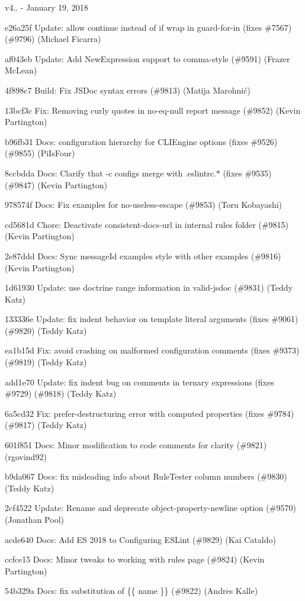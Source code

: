 v4.. -\/ January 19, 2018


\begin{DoxyItemize}
\item e26a25f Update\+: allow continue instead of if wrap in guard-\/for-\/in (fixes \#7567) (\#9796) (Michael Ficarra)
\item af043eb Update\+: Add New\+Expression support to comma-\/style (\#9591) (Frazer Mc\+Lean)
\item 4f898c7 Build\+: Fix JSDoc syntax errors (\#9813) (Matija Marohnić)
\item 13bcf3c Fix\+: Removing curly quotes in no-\/eq-\/null report message (\#9852) (Kevin Partington)
\item b96fb31 Docs\+: configuration hierarchy for CLIEngine options (fixes \#9526) (\#9855) (Pi\+Is\+Four)
\item 8ccbdda Docs\+: Clarify that -\/c configs merge with {\ttfamily .eslintrc.\texorpdfstring{$\ast$}{*}} (fixes \#9535) (\#9847) (Kevin Partington)
\item 978574f Docs\+: Fix examples for no-\/useless-\/escape (\#9853) (Toru Kobayashi)
\item cd5681d Chore\+: Deactivate consistent-\/docs-\/url in internal rules folder (\#9815) (Kevin Partington)
\item 2e87ddd Docs\+: Sync message\+Id examples\textquotesingle{} style with other examples (\#9816) (Kevin Partington)
\item 1d61930 Update\+: use doctrine range information in valid-\/jsdoc (\#9831) (Teddy Katz)
\item 133336e Update\+: fix indent behavior on template literal arguments (fixes \#9061) (\#9820) (Teddy Katz)
\item ea1b15d Fix\+: avoid crashing on malformed configuration comments (fixes \#9373) (\#9819) (Teddy Katz)
\item add1e70 Update\+: fix indent bug on comments in ternary expressions (fixes \#9729) (\#9818) (Teddy Katz)
\item 6a5cd32 Fix\+: prefer-\/destructuring error with computed properties (fixes \#9784) (\#9817) (Teddy Katz)
\item 601f851 Docs\+: Minor modification to code comments for clarity (\#9821) (rgovind92)
\item b9da067 Docs\+: fix misleading info about Rule\+Tester column numbers (\#9830) (Teddy Katz)
\item 2cf4522 Update\+: Rename and deprecate object-\/property-\/newline option (\#9570) (Jonathan Pool)
\item acde640 Docs\+: Add ES 2018 to Configuring ESLint (\#9829) (Kai Cataldo)
\item ccfce15 Docs\+: Minor tweaks to working with rules page (\#9824) (Kevin Partington)
\item 54b329a Docs\+: fix substitution of \{\{ name \}\} (\#9822) (Andres Kalle)
\end{DoxyItemize}

